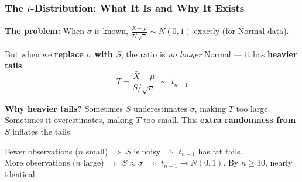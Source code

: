 \documentclass[aspectratio=169]{beamer}
\begin{document}
\begin{frame}
\frametitle{The $t$-Distribution: What It Is and Why It Exists}

\small
\textbf{The problem:} When $\sigma$ is known, $\frac{\bar{X} - \mu}{\sigma/\sqrt{n}} \sim N(0,1)$ exactly (for Normal data).

\vspace{0.1cm}
But when we \textbf{replace $\sigma$ with $S$}, the ratio is \textit{no longer} Normal --- it has \textbf{heavier tails}:
$$T = \frac{\bar{X} - \mu}{S/\sqrt{n}} \;\sim\; t_{n-1}$$

\pause
\vspace{-0.1cm}
\textbf{Why heavier tails?} Sometimes $S$ underestimates $\sigma$, making $T$ too large. Sometimes it overestimates, making $T$ too small. This \textbf{extra randomness from $S$} inflates the tails.

\pause
\vspace{0.1cm}
\begin{center}
\end{center}

\vspace{-0.15cm}
\centering\small
Fewer observations ($n$ small) $\Rightarrow$ $S$ is noisy $\Rightarrow$ $t_{n-1}$ has fat tails.\\
More observations ($n$ large) $\Rightarrow$ $S \approx \sigma$ $\Rightarrow$ $t_{n-1} \to N(0,1)$. \; By $n \geq 30$, nearly identical.
\end{frame}
\end{document}
